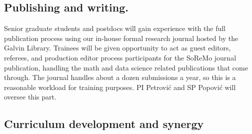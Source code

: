 \documentclass[11pt]{NSFamsart}
\begin{document}
\subsection*{Publishing and writing.} Senior graduate students and postdocs will gain experience with the full publication process using our in-house formal research journal hosted by the Galvin Library. Trainees will be given opportunity to act as guest editors, referees, and production editor process participants for the SoReMo journal publication, handling the math and data science related publications that come through. The journal handles about a dozen submissions a year, so this is a reasonable workload for training purposes. PI Petrovi\'c and SP Popovi\'c will oversee this  part. 


\subsection*{Curriculum development and synergy} \label{curriculum}
\end{document}
